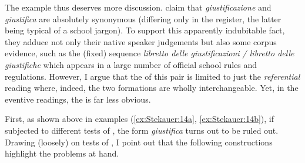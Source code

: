 \documentclass[output=paper]{langsci/langscibook}
\begin{document}
\begin{exe}
\ex\label{ex:Stekauer:14}
\begin{xlist}
\label{ex:Stekauer:14a}
\label{ex:Stekauer:14b}
\end{xlist}
\end{exe}

The example thus deserves more discussion. %
\citet[192]{MonterminiThornton2014} %
%
claim that \emph{giustificazione} and \emph{giustifica} are
absolutely synonymous (differing only in the register, the latter being
typical of a school jargon). To support this apparently indubitable
fact, they adduce not only their native speaker judgements but also some
corpus evidence, such as the (fixed) sequence \emph{libretto delle
giustificazioni / libretto delle giustifiche} which appears in a large
number of official school rules and regulations. However, I argue that
the  of this pair is limited to just the \emph{referential}
reading where, indeed, the two formations are wholly interchangeable.
Yet, in the eventive readings, the  is far less obvious.

First, as shown above in examples (\ref{ex:Stekauer:14a}, \ref{ex:Stekauer:14b}), if subjected to different tests
of , the form \emph{giustifica} turns out to be ruled out.
Drawing (loosely) on %
%
tests of , I point
out that the following constructions highlight the problems at hand.
\end{document}
